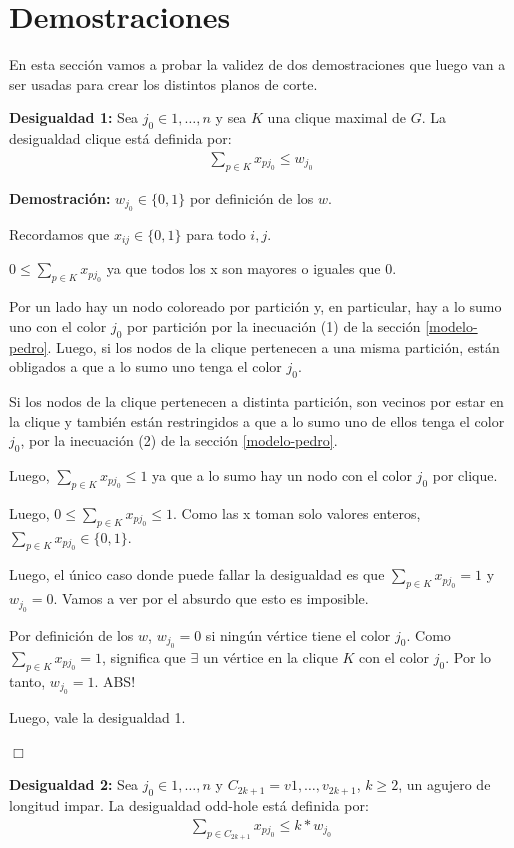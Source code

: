 \documentclass[a4paper, 10pt, twoside]{article}
\begin{document}
\section{Demostraciones}

En esta sección vamos a probar la validez de dos demostraciones que luego van a ser usadas para crear los distintos planos de corte.

\textbf{Desigualdad 1:} Sea $j_0 \in {1, \ldots, n}$ y sea $K$ una clique maximal de $G$. La desigualdad clique está definida por:
\begin{align*}
\sum_{p \in K} x_{pj_0} \leq w_{j_0}
\end{align*}

\textbf{Demostración:}
$w_{j_0} \in \{0,1\}$ por definición de los $w$.

Recordamos que $x_{ij} \in \{0,1\}$ para todo $i, j$.

$0 \leq \sum_{p \in K} x_{pj_0}$ ya que todos los x son mayores o iguales que $0$.

Por un lado hay un nodo coloreado por partición y, en particular, hay a lo sumo uno con el color $j_0$ por partición por la inecuación (1) de la sección \ref{modelo-pedro}. Luego, si los nodos de la clique pertenecen a una misma partición, están obligados a que a lo sumo uno tenga el color $j_0$.

Si los nodos de la clique pertenecen a distinta partición, son vecinos por estar en la clique y también están restringidos a que a lo sumo uno de ellos tenga el color $j_0$, por la inecuación (2) de la sección \ref{modelo-pedro}.

Luego, $\sum_{p \in K} x_{pj_0} \leq 1$ ya que a lo sumo hay un nodo con el color $j_0$ por clique.

Luego, $0 \leq \sum_{p \in K} x_{pj_0} \leq 1$. Como las x toman solo valores enteros, $\sum_{p \in K} x_{pj_0} \in \{0,1\}$.

Luego, el único caso donde puede fallar la desigualdad es que $\sum_{p \in K} x_{pj_0} = 1$ y $w_{j_0} = 0$. Vamos a ver por el absurdo que esto es imposible.

Por definición de los $w$, $w_{j_0} = 0$ si ningún vértice tiene el color $j_0$. Como $\sum_{p \in K} x_{pj_0} = 1$, significa que $\exists$ un vértice en la clique $K$ con el color $j_0$. Por lo tanto, $w_{j_0} = 1$. ABS!

Luego, vale la desigualdad 1.

\hfill \ensuremath{\Box}

\textbf{Desigualdad 2:} Sea $j_0 \in {1, \ldots, n}$ y $C_{2k+1} = v1, \ldots, v_{2k+1}$, $k \geq 2$, un agujero de longitud impar. La desigualdad odd-hole está definida por:
\begin{align*}
\sum_{p \in C_{2k+1}} x_{pj_0} \leq  k * w_{j_0}
\end{align*}
\end{document}
